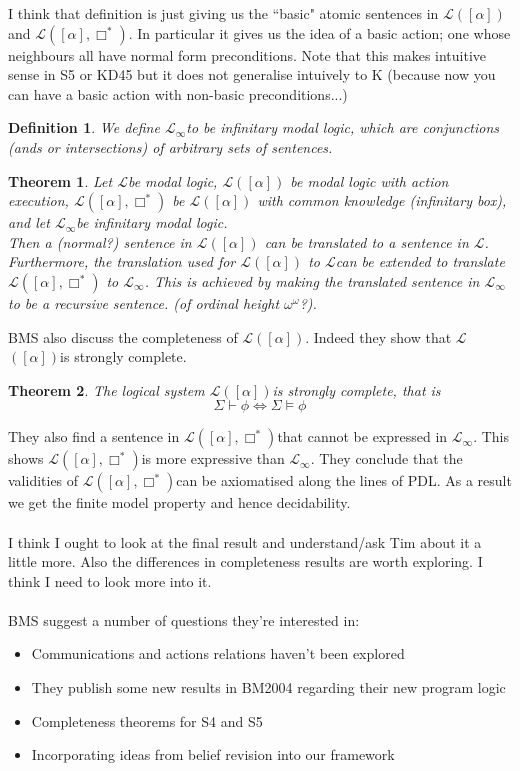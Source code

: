 \documentclass[10pt, a4paper, twoside]{article}
\newcommand{\modalLog}{$\mathcal{L}$}
\newcommand{\modLogInf}{$\mathcal{L}_{\infty}$}
\newcommand{\epActLog}{\modalLog $([\alpha])$}
\newcommand{\epActLogCommonKnowledge}{\modalLog$([\alpha],\Box^{\ast})$}
\newtheorem{defn}{Definition}
\newtheorem{thm}{Theorem}
\begin{document}
I think that definition is just giving us the ``basic" atomic sentences in
\modalLog$([\alpha])$ and \modalLog$([\alpha], \Box^{\ast})$.
In particular it gives us the idea of a basic action; one whose neighbours all
have normal form preconditions.
Note that this makes intuitive sense in S5 or KD45 but it does not generalise
intuively to K (because now you can have a basic action with non-basic
preconditions...)
\begin{defn}
We define \modLogInf to be infinitary modal logic, which are conjunctions (ands
or intersections) of arbitrary sets of sentences.
\end{defn}
\begin{thm}
Let \modalLog be modal logic, \modalLog$([\alpha])$ be modal logic with action
execution, \modalLog$([\alpha],\Box^{\ast})$ be \modalLog$([\alpha])$ with common
knowledge (infinitary box), and let \modLogInf be infinitary modal logic.\\
Then a (normal?) sentence in \modalLog$([\alpha])$ can be translated to a
sentence in \modalLog.\\
Furthermore, the translation used for \modalLog$([\alpha])$ to \modalLog can be
extended to translate \modalLog$([\alpha],\Box^{\ast})$ to \modLogInf.
This is achieved by making the translated sentence in \modLogInf to be a
recursive sentence. (of ordinal height $\omega^\omega$?).
\end{thm}
BMS also discuss the completeness of \epActLog.
Indeed they show that \epActLog is strongly complete.
\begin{thm}
The logical system \epActLog is strongly complete, that is
\[
  \Sigma \vdash \phi \iff \Sigma \models \phi
\]
\end{thm}
They also find a sentence in \epActLogCommonKnowledge that cannot be expressed
in \modLogInf.
This shows \epActLogCommonKnowledge is more expressive than \modLogInf.
They conclude that the validities of \epActLogCommonKnowledge can be axiomatised
along the lines of PDL.
As a result we get the finite model property and hence decidability.\\
\\
I think I ought to look at the final result and understand/ask Tim about it a
little more.
Also the differences in completeness results are worth exploring.
I think I need to look more into it.\\
\\
BMS suggest a number of questions they're interested in:
\begin{itemize}
  \item Communications and actions relations haven't been explored
  \item They publish some new results in BM2004 regarding their new program
  logic
  \item Completeness theorems for S4 and S5
  \item Incorporating ideas from belief revision into our framework
\end{itemize}
\end{document}
